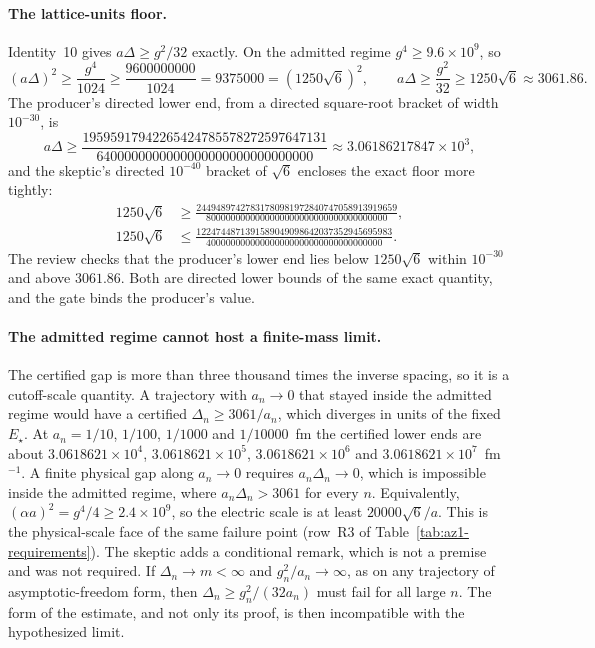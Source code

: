 \paragraph{The lattice-units floor.}
Identity~10 gives $a\Delta\ge g^2/32$ exactly. On the admitted regime
$g^4\ge9.6\times10^9$, so
\begin{equation}
 (a\Delta)^2\ge\frac{g^4}{1024}\ge\frac{9600000000}{1024}=9375000=(1250\sqrt6)^2,
 \qquad a\Delta\ge\frac{g^2}{32}\ge1250\sqrt6\approx3061.86 .
 \label{eq:az1-floor}
\end{equation}
The producer's directed lower end, from a directed square-root bracket of
width $10^{-30}$, is
\begin{equation}
 a\Delta\ge\frac{19595917942265424785578272597647131}{6400000000000000000000000000000}
 \approx3.06186217847\times10^3 ,
 \label{eq:az1-floor-lower}
\end{equation}
and the skeptic's directed $10^{-40}$ bracket of $\sqrt6$ encloses the exact
floor more tightly:
\begin{equation}
 \begin{aligned}
 1250\sqrt6&\ge\frac{24494897427831780981972840747058913919659}{8000000000000000000000000000000000000},\\
 1250\sqrt6&\le\frac{1224744871391589049098642037352945695983}{400000000000000000000000000000000000}.
 \end{aligned}
 \label{eq:az1-floor-bracket}
\end{equation}
The review checks that the producer's lower end lies below $1250\sqrt6$
within $10^{-30}$ and above $3061.86$. Both are directed lower bounds of the
same exact quantity, and the gate binds the producer's value.

\paragraph{The admitted regime cannot host a finite-mass limit.}
The certified gap is more than three thousand times the inverse spacing, so
it is a cutoff-scale quantity. A trajectory with $a_n\to0$ that stayed inside
the admitted regime would have a certified $\Delta_n\ge3061/a_n$, which
diverges in units of the fixed $E_\star$. At $a_n=1/10$, $1/100$, $1/1000$ and
$1/10000$~fm the certified lower ends are about $3.0618621\times10^4$,
$3.0618621\times10^5$, $3.0618621\times10^6$ and
$3.0618621\times10^7$~fm$^{-1}$. A finite physical gap along $a_n\to0$
requires $a_n\Delta_n\to0$, which is impossible inside the admitted regime,
where $a_n\Delta_n>3061$ for every $n$. Equivalently, $(\alpha a)^2=g^4/4\ge
2.4\times10^9$, so the electric scale is at least $20000\sqrt6/a$. This is
the physical-scale face of the same failure point (row~R3 of
Table~\ref{tab:az1-requirements}). The skeptic adds a conditional remark,
which is not a premise and was not required. If $\Delta_n\to m<\infty$ and
$g_n^2/a_n\to\infty$, as on any trajectory of asymptotic-freedom form, then
$\Delta_n\ge g_n^2/(32a_n)$ must fail for all large $n$. The form of the
estimate, and not only its proof, is then incompatible with the hypothesized
limit.

